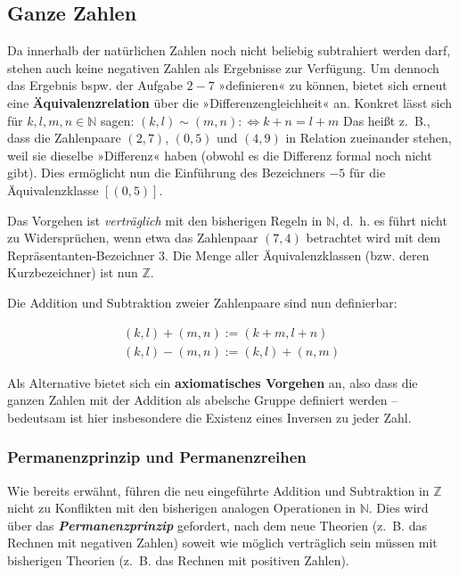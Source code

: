\documentclass[
]{scrbook}
\theoremstyle{definition}
\theoremstyle{definition}
\theoremstyle{definition}
\theoremstyle{definition}
\theoremstyle{remark}
\begin{document}
\subsection{Ganze Zahlen}\label{ganze-zahlen}

Da innerhalb der natürlichen Zahlen noch nicht beliebig subtrahiert werden darf, stehen auch keine negativen Zahlen als Ergebnisse zur Verfügung. Um dennoch das Ergebnis bspw. der Aufgabe \(2-7\) »definieren« zu können, bietet sich erneut eine \textbf{Äquivalenzrelation} über die »Differenzengleichheit« an. Konkret lässt sich für \(k,l,m,n\in\mathbb{N}\) sagen:
\((k,l)\sim (m,n):\Leftrightarrow k+n=l+m\)
Das heißt z.~B., dass die Zahlenpaare \((2,7)\), \((0,5)\) und \((4,9)\) in Relation zueinander stehen, weil sie dieselbe »Differenz« haben (obwohl es die Differenz formal noch nicht gibt). Dies ermöglicht nun die Einführung des Bezeichners \(-5\) für die Äquivalenzklasse \([(0,5)]\).

Das Vorgehen ist \emph{verträglich} mit den bisherigen Regeln in \(\mathbb{N}\), d.~h. es führt nicht zu Widersprüchen, wenn etwa das Zahlenpaar \((7,4)\) betrachtet wird mit dem Repräsentanten-Bezeichner \(3\). Die Menge aller Äquivalenzklassen (bzw. deren Kurzbezeichner) ist nun \(\mathbb{Z}\).

Die Addition und Subtraktion zweier Zahlenpaare sind nun definierbar:

\begin{align}
(k, l) + (m, n) := (k + m, l + n)\\
(k, l) − (m, n) := (k, l) + (n, m)
\end{align}

Als Alternative bietet sich ein \textbf{axiomatisches Vorgehen} an, also dass die ganzen Zahlen mit der Addition als abelsche Gruppe definiert werden -- bedeutsam ist hier insbesondere die Existenz eines Inversen zu jeder Zahl.

\subsubsection{Permanenzprinzip und Permanenzreihen}\label{permanenzprinzip-und-permanenzreihen}

Wie bereits erwähnt, führen die neu eingeführte Addition und Subtraktion in \(\mathbb{Z}\) nicht zu Konflikten mit den bisherigen analogen Operationen in \(\mathbb{N}\). Dies wird über das \textbf{\emph{Permanenzprinzip}} gefordert, nach dem neue Theorien (z.~B. das Rechnen mit negativen Zahlen) soweit wie möglich verträglich sein müssen mit bisherigen Theorien (z.~B. das Rechnen mit positiven Zahlen).
\end{document}
